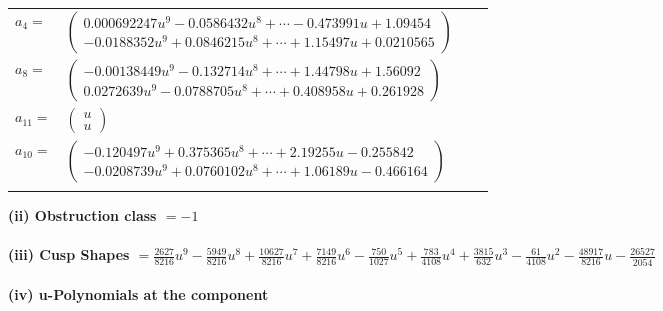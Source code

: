 \documentclass[1p]{elsarticle_modified}
\theoremstyle{definition}
\begin{document}
\begin{tabular}{m{7pt} m{180pt} m{7pt} m{180pt} }
\flushright $a_{4}=$&$\begin{pmatrix}0.000692247 u^{9}-0.0586432 u^{8}+\cdots-0.473991 u+1.09454\\-0.0188352 u^{9}+0.0846215 u^{8}+\cdots+1.15497 u+0.0210565\end{pmatrix}$ \\
\flushright $a_{8}=$&$\begin{pmatrix}-0.00138449 u^{9}-0.132714 u^{8}+\cdots+1.44798 u+1.56092\\0.0272639 u^{9}-0.0788705 u^{8}+\cdots+0.408958 u+0.261928\end{pmatrix}$ \\
\flushright $a_{11}=$&$\begin{pmatrix}u\\u\end{pmatrix}$ \\
\flushright $a_{10}=$&$\begin{pmatrix}-0.120497 u^{9}+0.375365 u^{8}+\cdots+2.19255 u-0.255842\\-0.0208739 u^{9}+0.0760102 u^{8}+\cdots+1.06189 u-0.466164\end{pmatrix}$\\&\end{tabular}
\flushleft \textbf{(ii) Obstruction class $= -1$}\\~\\
\flushleft \textbf{(iii) Cusp Shapes $= \frac{2627}{8216} u^9-\frac{5949}{8216} u^8+\frac{10627}{8216} u^7+\frac{7149}{8216} u^6-\frac{750}{1027} u^5+\frac{783}{4108} u^4+\frac{3815}{632} u^3-\frac{61}{4108} u^2-\frac{48917}{8216} u-\frac{26527}{2054}$}\\~\\
\newpage\renewcommand{\arraystretch}{1}
\flushleft \textbf{(iv) u-Polynomials at the component}\newline \\
\end{document}
